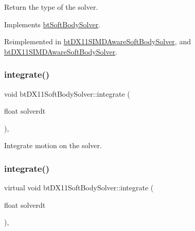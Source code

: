 Return the type of the solver. 

Implements \hyperlink{classbtSoftBodySolver_aa08308ddb8e4661ab3c3e23cf3da647c}{bt\+Soft\+Body\+Solver}.



Reimplemented in \hyperlink{classbtDX11SIMDAwareSoftBodySolver_ad36369c7c58e1cb8ddea7ebd54612eb9}{bt\+D\+X11\+S\+I\+M\+D\+Aware\+Soft\+Body\+Solver}, and \hyperlink{classbtDX11SIMDAwareSoftBodySolver_ad36369c7c58e1cb8ddea7ebd54612eb9}{bt\+D\+X11\+S\+I\+M\+D\+Aware\+Soft\+Body\+Solver}.

\mbox{\label{classbtDX11SoftBodySolver_a3daaaf85934fabb4c38ae0d32ec77678}} 
\subsubsection{\texorpdfstring{integrate()}{integrate()}\hspace{0.1cm}{\footnotesize\ttfamily [1/2]}}
{\footnotesize\ttfamily void bt\+D\+X11\+Soft\+Body\+Solver\+::integrate (\begin{DoxyParamCaption}\item[{float}]{solverdt }\end{DoxyParamCaption})\hspace{0.3cm}{\ttfamily [protected]}, {\ttfamily [virtual]}}

Integrate motion on the solver. \mbox{\label{classbtDX11SoftBodySolver_a7453302b8e92e309fabc922ce09967e1}} 
\subsubsection{\texorpdfstring{integrate()}{integrate()}\hspace{0.1cm}{\footnotesize\ttfamily [2/2]}}
{\footnotesize\ttfamily virtual void bt\+D\+X11\+Soft\+Body\+Solver\+::integrate (\begin{DoxyParamCaption}\item[{float}]{solverdt }\end{DoxyParamCaption})\hspace{0.3cm}{\ttfamily [protected]}, {\ttfamily [virtual]}}

